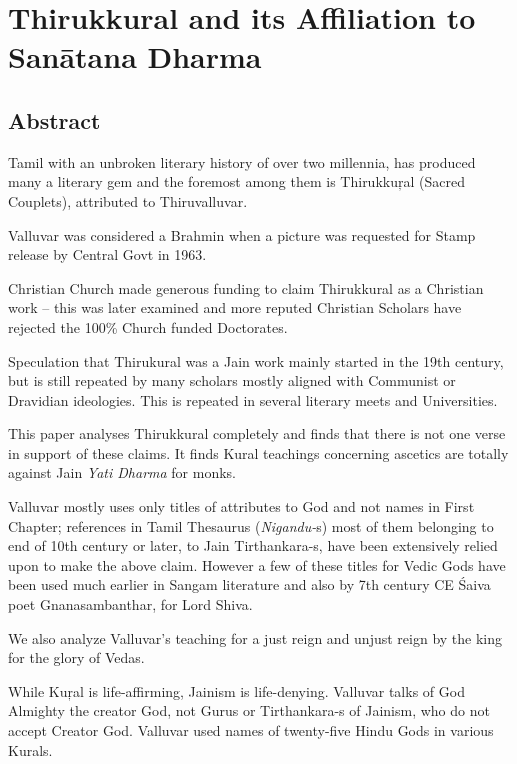 
\chapter{Thirukkural and its Affiliation to Sanātana Dharma}\label{chap04}



\section*{Abstract}

Tamil with an unbroken literary history of over two millennia, has produced many a literary gem and the foremost among them is Thirukkuŗal (Sacred Couplets), attributed to Thiruvalluvar.

Valluvar was considered a Brahmin when a picture was requested for Stamp release by Central Govt in 1963.

Christian Church made generous funding to claim Thirukkural as a Christian work – this was later examined and more reputed Christian Scholars have rejected the 100\% Church funded Doctorates.

Speculation that Thirukural was a Jain work mainly started in the 19th century, but is still repeated by many scholars mostly aligned with Communist or Dravidian ideologies. This is repeated in several literary meets and Universities.

This paper analyses Thirukkural completely and finds that there is not one verse in support of these claims. It finds Kural teachings concerning ascetics are totally against Jain \textit{Yati Dharma} for monks.

Valluvar mostly uses only titles of attributes to God and not names in First Chapter; references in Tamil Thesaurus (\textit{Nigandu-}s) most of them belonging to end of 10th century or later, to Jain Tirthankara-s, have been extensively relied upon to make the above claim. However a few of these titles for Vedic Gods have been used much earlier in Sangam literature and also by 7th century CE Śaiva poet Gnanasambanthar, for Lord Shiva.

We also analyze Valluvar’s teaching for a just reign and unjust reign by the king for the glory of Vedas.

While Kuŗal is life-affirming, Jainism is life-denying. Valluvar talks of God Almighty the creator God, not Gurus or Tirthankara-s of Jainism, who do not accept Creator God. Valluvar used names of twenty-five Hindu Gods in various Kurals.

